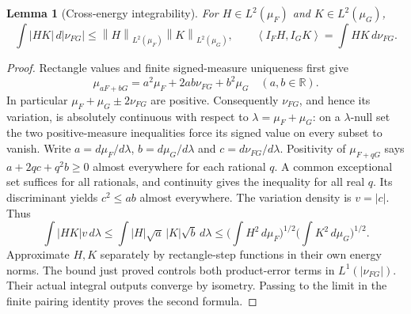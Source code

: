 \documentclass[11pt]{article}
\newtheorem{lemma}[theorem]{Lemma}
\theoremstyle{remark}\newtheorem{remark}[theorem]{Remark}
\newcommand{\R}{\mathbb R}
\newcommand{\norm}[1]{\left\lVert#1\right\rVert}
\newcommand{\inner}[2]{\left\langle#1,#2\right\rangle}
\begin{document}
\begin{lemma}[Cross-energy integrability]\label{lem:cross}
For $H\in L^2(\mu_F)$ and $K\in L^2(\mu_G)$,
\begin{equation}\label{eq:cross}
 \int |HK|\,d|\nu_{FG}|\leq\norm H_{L^2(\mu_F)}
      \norm K_{L^2(\mu_G)},\qquad
 \inner{I_FH}{I_GK}=\int HK\,d\nu_{FG}.
\end{equation}
\end{lemma}
\begin{proof}
Rectangle values and finite signed-measure uniqueness first give
\[
 \mu_{aF+bG}=a^2\mu_F+2ab\nu_{FG}+b^2\mu_G
 \quad(a,b\in\R).
\]
In particular $\mu_F+\mu_G\pm2\nu_{FG}$ are positive. Consequently
$\nu_{FG}$, and hence its variation, is absolutely continuous with
respect to $\lambda=\mu_F+\mu_G$: on a $\lambda$-null set the two
positive-measure inequalities force its signed value on every subset
to vanish. Write $a=d\mu_F/d\lambda$, $b=d\mu_G/d\lambda$ and
$c=d\nu_{FG}/d\lambda$. Positivity of $\mu_{F+qG}$ says
$a+2qc+q^2b\geq0$ almost everywhere for each rational $q$.
A common exceptional set suffices for all rationals, and continuity
gives the inequality for all real $q$. Its discriminant yields
$c^2\leq ab$ almost everywhere. The variation density is $v=|c|$.
Thus
\[
 \int |HK|v\,d\lambda
 \leq\int |H|\sqrt a\,|K|\sqrt b\,d\lambda
 \leq\Big(\int H^2\,d\mu_F\Big)^{1/2}
       \Big(\int K^2\,d\mu_G\Big)^{1/2}.
\]
Approximate $H,K$ separately by rectangle-step functions in their own
energy norms. The bound just proved controls both product-error terms
in $L^1(|\nu_{FG}|)$. Their actual integral outputs converge by
isometry. Passing to the limit in the finite pairing identity proves
the second formula.
\end{proof}
\end{document}
